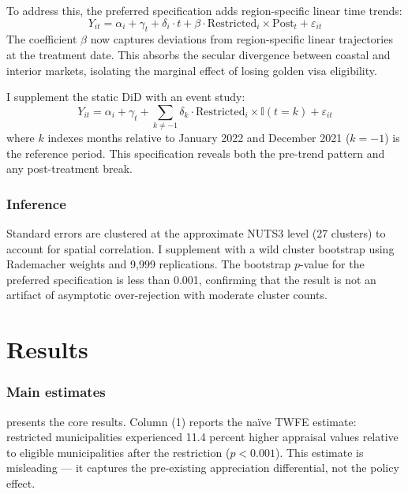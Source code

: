 \documentclass[12pt]{article}
\newcommand{\ind}{\mathbb{I}}
\begin{document}
To address this, the preferred specification adds region-specific linear time trends:
\begin{equation}
Y_{it} = \alpha_i + \gamma_t + \delta_i \cdot t + \beta \cdot \text{Restricted}_i \times \text{Post}_t + \varepsilon_{it}
\label{eq:trend}
\end{equation}
The coefficient $\beta$ now captures deviations from region-specific linear trajectories at the treatment date. This absorbs the secular divergence between coastal and interior markets, isolating the marginal effect of losing golden visa eligibility.

I supplement the static DiD with an event study:
\begin{equation}
Y_{it} = \alpha_i + \gamma_t + \sum_{k \neq -1} \delta_k \cdot \text{Restricted}_i \times \ind(t = k) + \varepsilon_{it}
\label{eq:es}
\end{equation}
where $k$ indexes months relative to January 2022 and December 2021 ($k = -1$) is the reference period. This specification reveals both the pre-trend pattern and any post-treatment break.

\subsubsection*{Inference} Standard errors are clustered at the approximate NUTS3 level (27 clusters) to account for spatial correlation. I supplement with a wild cluster bootstrap using Rademacher weights and 9,999 replications. The bootstrap $p$-value for the preferred specification is less than 0.001, confirming that the result is not an artifact of asymptotic over-rejection with moderate cluster counts.


\section{Results}

\subsubsection*{Main estimates}  presents the core results. Column (1) reports the na\"{i}ve TWFE estimate: restricted municipalities experienced 11.4 percent higher appraisal values relative to eligible municipalities after the restriction ($p < 0.001$). This estimate is misleading --- it captures the pre-existing appreciation differential, not the policy effect.
\end{document}
